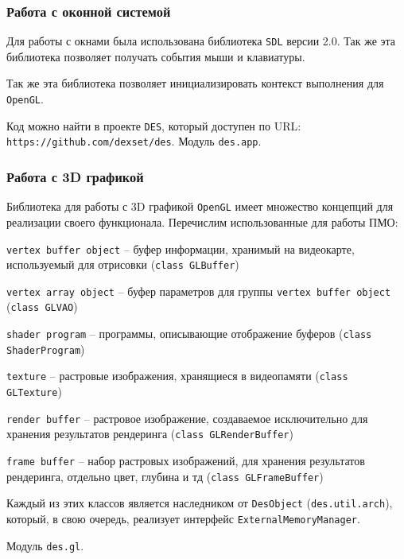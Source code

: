 \subsubsection{Работа с оконной системой}

Для работы с окнами была использована библиотека \verb|SDL| версии 2.0.
Так же эта библиотека позволяет получать события мыши и клавиатуры.

Так же эта библиотека позволяет инициализировать контекст выполнения для \verb|OpenGL|.

Код можно найти в проекте \verb|DES|, который доступен по URL: \verb|https://github.com/dexset/des|.
Модуль \verb|des.app|.

\newpage
\subsubsection{Работа с 3D графикой}

Библиотека для работы с 3D графикой \verb|OpenGL| имеет множество концепций для реализации
своего функционала. Перечислим использованные для работы ПМО:

\begin{mintemize}
\item \verb|vertex buffer object| -- буфер информации,
    хранимый на видеокарте, используемый для отрисовки
    (\verb|class GLBuffer|)
\item \verb|vertex array object| -- буфер параметров для
    группы \verb|vertex buffer object| (\verb|class GLVAO|)
\item \verb|shader program| -- программы, описывающие
    отображение буферов \linebreak (\verb|class ShaderProgram|)
\item \verb|texture| -- растровые изображения, хранящиеся
    в видеопамяти (\verb|class GLTexture|)
\item \verb|render buffer| -- растровое изображение, создаваемое
    исключительно для хранения результатов рендеринга
    (\verb|class GLRenderBuffer|)
\item \verb|frame buffer| -- набор растровых изображений,
    для хранения результатов рендеринга, отдельно цвет,
    глубина и тд (\verb|class GLFrameBuffer|)
\end{mintemize}

Каждый из этих классов является наследником от \verb|DesObject|
(\verb|des.util.arch|), который, в свою очередь, реализует интерфейс
\verb|ExternalMemoryManager|.

Модуль \verb|des.gl|.

